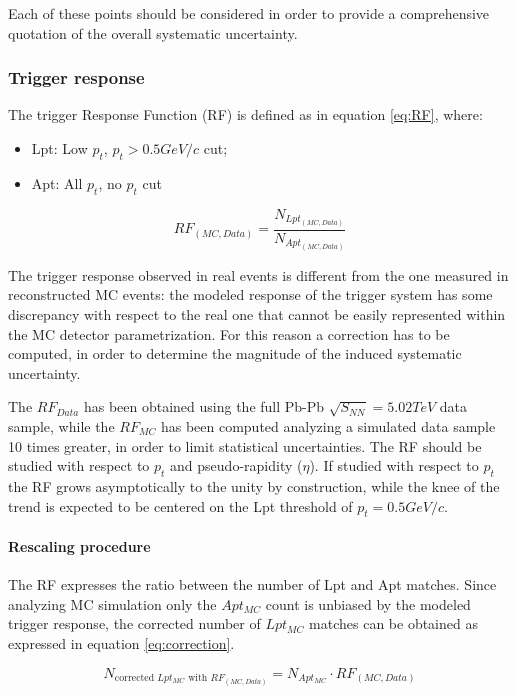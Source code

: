 Each of these points should be considered in order to provide a comprehensive quotation of the overall systematic uncertainty.

\subsubsection{Trigger response}
The trigger Response Function (RF) is defined as in equation \ref{eq:RF}, where:
\begin{itemize}
	\item Lpt: Low $p_t$, $p_t>0.5 GeV/c$ cut;
	\item Apt: All $p_t$, no $p_t$ cut
\end{itemize}

\begin{equation}\label{eq:RF}
RF_{(MC,Data)}=\frac{N_{Lpt_{(MC,Data)}}}{N_{Apt_{(MC,Data)}}}	
\end{equation}

The trigger response observed in real events is different from the one measured in reconstructed MC events: the modeled response of the trigger system has some discrepancy with respect to the real one that cannot be easily represented within the MC detector parametrization. For this reason a correction has to be computed, in order to determine the magnitude of the induced systematic uncertainty.

The $RF_{Data}$ has been obtained using the full Pb-Pb $\sqrt{S_{NN}}=5.02 TeV$ data sample, while the $RF_{MC}$ has been computed analyzing a simulated data sample 10 times greater, in order to limit statistical uncertainties.
The RF should be studied with respect to $p_t$ and pseudo-rapidity ($\eta$). If studied with respect to $p_t$ the RF grows asymptotically to the unity by construction, while the knee of the trend is expected to be centered on the Lpt threshold of $p_t=0.5 GeV/c$.

\paragraph{Rescaling procedure}
The RF expresses the ratio between the number of Lpt and Apt matches. Since analyzing MC simulation only the $Apt_{MC}$ count is unbiased by the modeled trigger response, the corrected number of $Lpt_{MC}$ matches can be obtained as expressed in equation \ref{eq:correction}.

\begin{equation}\label{eq:correction}
	N_{\text{corrected $Lpt_{MC}$ with $RF_{(MC,Data)}$}}=N_{Apt_{MC}}\cdot RF_{(MC,Data)}
\end{equation}

